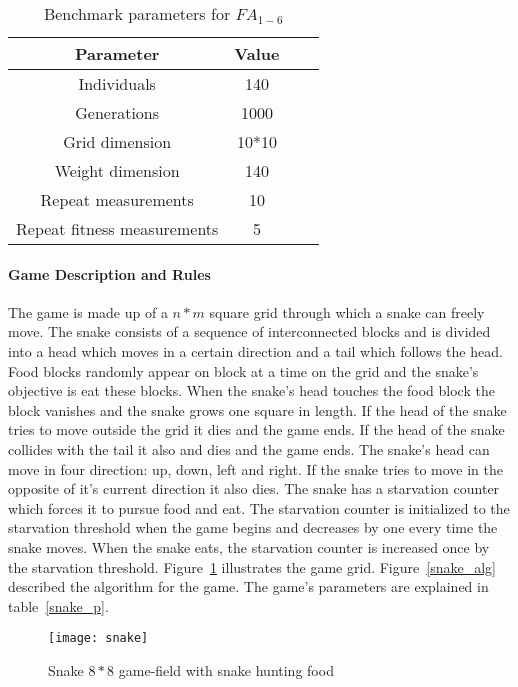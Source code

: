 \begin{table}[H]
  \centering
  \begin{center}
    \footnotesize
    \begin{tabular}{ | c | c | c | c | }
      \hline
      Parameter & Value  \\ \hline
      Individuals & 140 \\ \hline
      Generations & 1000 \\ \hline
      Grid dimension & 10*10 \\ \hline
      Weight dimension & 140 \\ \hline
      Repeat measurements & 10 \\ \hline
      Repeat fitness measurements & 5 \\ \hline
    \end{tabular}
  \end{center}
  \caption{Benchmark parameters for $FA_{1-6}$}
  \label{table:fa1-6_params}
\end{table}

\paragraph{Game Description and Rules}

The game is made up of a $n*m$ square grid through which a snake can freely move. The snake consists of a sequence of interconnected blocks and is divided into a head which moves in a certain direction and a tail which follows the head. Food blocks randomly appear on block at a time on the grid and the snake's objective is eat these blocks. When the snake's head touches the food block the block vanishes and the snake grows one square in length. If the head of the snake tries to move outside the grid it dies and the game ends. If the head of the snake collides with the tail it also and dies and the game ends. The snake's head can move in four direction: up, down, left and right. If the snake tries to move in the opposite of it's current direction it also dies. The snake has a starvation counter which forces it to pursue food and eat. The starvation counter is initialized to the starvation threshold when the game begins and decreases by one every time the snake moves. When the snake eats, the starvation counter is increased once by the starvation threshold. Figure~\ref{snake} illustrates the game grid. Figure~\ref{snake_alg} described the algorithm for the game. The game's parameters are explained in table~\ref{snake_p}.

\begin{figure}[H]
  \centering
  \texttt{[image: snake]}
  \caption{Snake $8*8$ game-field with snake hunting food}
  \label{snake}
\end{figure}



